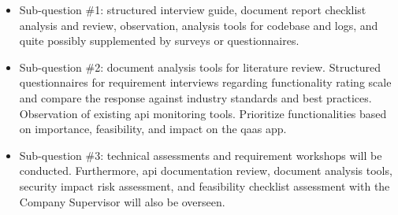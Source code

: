 \begin{multicols}{2}
\begin{itemize}[label=-]
      \end{itemize}
      \begin{itemize}[label=-]
            \item Sub-question \#1: structured interview guide, document report checklist analysis and review,
                  observation, analysis tools for codebase and logs, and quite possibly supplemented by surveys
                  or questionnaires.
            \item Sub-question \#2: document analysis tools for literature review. Structured questionnaires for
                  requirement interviews regarding functionality rating scale and compare the response against
                  industry standards and best practices. Observation of existing \acrshort{api} monitoring tools.
                  Prioritize functionalities based on importance, feasibility, and impact on the \acrshort{qaas} app.
            \item Sub-question \#3: technical assessments and requirement workshops will be conducted. Furthermore,
                  \acrshort{api} documentation  review, document analysis tools, security impact risk assessment,
                  and feasibility checklist assessment with the Company Supervisor will also be overseen.
      \end{itemize}

\end{multicols}
